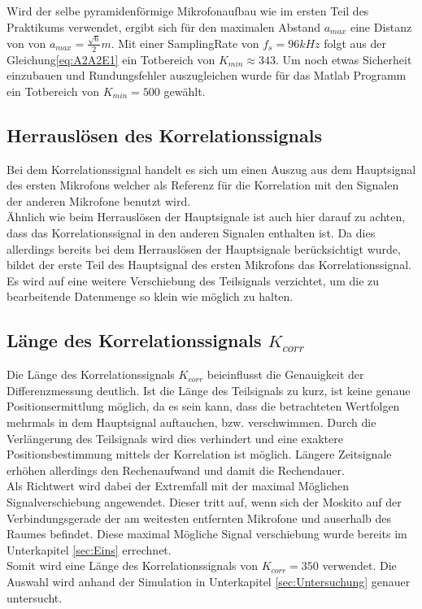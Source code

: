 Wird der selbe pyramidenförmige Mikrofonaufbau wie im ersten Teil des Praktikums verwendet, ergibt sich für den maximalen Abstand $a_{max}$ eine Distanz von von $a_{max} = \frac{\sqrt{6}}{2}m$. Mit einer SamplingRate von $f_s = 96 kHz$ folgt aus der Gleichung\eqref{eq:A2A2E1} ein Totbereich von $K_{min} \approx 343$. Um noch etwas Sicherheit einzubauen und Rundungsfehler auszugleichen wurde für das Matlab Programm ein Totbereich von $K_{min} = 500$ gewählt.

\subsection{Herrauslösen des Korrelationssignals}
Bei dem Korrelationssignal handelt es sich um einen Auszug aus dem Hauptsignal des ersten Mikrofons welcher als Referenz für die Korrelation mit den Signalen der anderen Mikrofone benutzt wird.\\
Ähnlich wie beim Herrauslösen der Hauptsignale ist auch hier darauf zu achten, dass das Korrelationssignal in den anderen Signalen enthalten ist. Da dies allerdings bereits bei dem Herrauslösen der Hauptsignale berücksichtigt wurde, bildet der erste Teil des Hauptsignal des ersten Mikrofons das Korrelationssignal. Es wird auf eine weitere Verschiebung des Teilsignals verzichtet, um die zu bearbeitende Datenmenge so klein wie möglich zu halten.


\subsection{Länge des Korrelationssignals $K_{corr}$}
Die Länge des Korrelationssignals $K_{corr}$ beieinflusst die Genauigkeit der Differenzmessung deutlich. Ist die Länge des Teilsignals zu kurz, ist keine genaue Positionsermittlung möglich, da es sein kann, dass die betrachteten Wertfolgen mehrmals in dem Hauptsignal auftauchen, bzw. verschwimmen. Durch die Verlängerung des Teilsignals wird dies verhindert und eine exaktere Positionsbestimmung mittels der Korrelation ist möglich. Längere Zeitsignale erhöhen allerdings den Rechenaufwand und damit die Rechendauer. \\
Als Richtwert wird dabei der Extremfall mit der maximal Möglichen Signalverschiebung angewendet. Dieser tritt auf, wenn sich der Moskito auf der Verbindungsgerade der am weitesten entfernten Mikrofone und auserhalb des Raumes befindet. 
Diese maximal Mögliche Signal verschiebung wurde bereits im Unterkapitel \ref{sec:Eins}  errechnet.\\
Somit wird eine Länge des Korrelationssignals von $K_{corr}=350$ verwendet. Die Auswahl wird anhand der Simulation in Unterkapitel  \ref{sec:Untersuchung} genauer untersucht.    
\\
